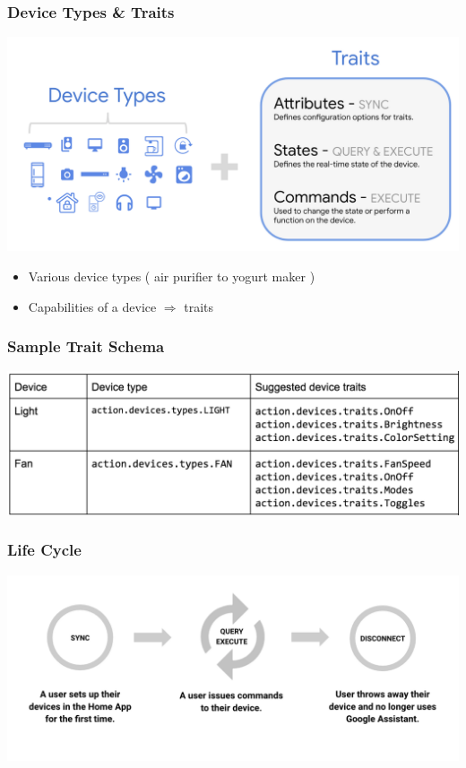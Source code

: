 \documentclass{beamer}
\begin{document}
\begin{frame}
\frametitle{Device Types \& Traits}
\begin{center}
\includegraphics[scale=0.2]{pictures/state_commands.png} 
\end{center}
\begin{itemize}
\item Various device types ( air purifier to yogurt maker )
\item Capabilities of a device $\Rightarrow$ traits
\end{itemize}
\end{frame}

\begin{frame}
\frametitle{Sample Trait Schema}
\begin{center}
\includegraphics[scale=0.25]{pictures/types_and_traits.png} 
\end{center}
\end{frame}

\begin{frame}
\frametitle{Life Cycle}
\begin{center}
\includegraphics[scale=0.22]{pictures/cycle.png}
\end{center}
\end{frame}
\end{document}
